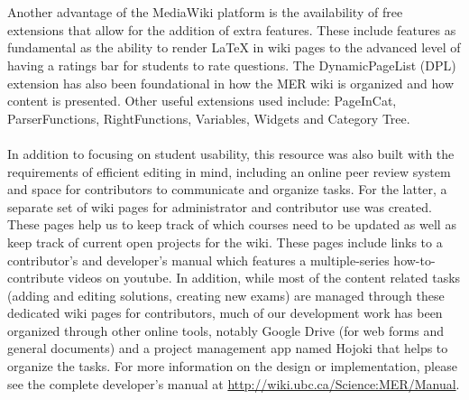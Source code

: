 \documentclass{primus}
\begin{document}
\\\\
\noindent{}Another advantage of the MediaWiki platform is the availability of free extensions that allow for the addition of extra features. These include features as fundamental as the ability to render LaTeX in wiki pages to the advanced level of having a ratings bar for students to rate questions. The DynamicPageList (DPL) extension has also been foundational in how the MER wiki is organized and how content is presented. Other useful extensions used include: PageInCat, ParserFunctions, RightFunctions, Variables, Widgets and Category Tree.
\\\\
\noindent{}In addition to focusing on student usability, this resource was also built with the requirements of efficient editing in mind, including an online peer review system and space for contributors to communicate and organize tasks. For the latter, a separate set of wiki pages for administrator and contributor use was created. These pages help us to keep track of which courses need to be updated as well as keep track of current open projects for the wiki. These pages include links to a contributor’s and developer’s manual which features a multiple-series how-to-contribute videos on youtube. In addition, while most of the content related tasks (adding and editing solutions, creating new exams) are managed through these dedicated wiki pages for contributors, much of our development work has been organized through other online tools, notably Google Drive (for web forms and general documents) and a project management app named Hojoki that helps to organize the tasks. For more information on the design or implementation, please see the complete developer’s manual at \url{http://wiki.ubc.ca/Science:MER/Manual}.
\end{document}
